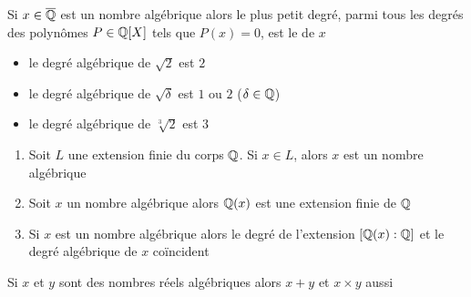 \begin{frame}

Si $x \in \overline{\mathbb{Q}}$ est un nombre algébrique alors le plus petit degré, 
parmi tous les degrés des polynômes $P \in \mathbb{Q}[X]$ tels que $P(x)=0$,
est le  de $x$

\pause

\begin{itemize}
  \item le degré algébrique de $\sqrt 2$ est $2$
  \pause
  \item le degré algébrique de $\sqrt \delta$ est $1$ ou $2$ ($\delta \in \mathbb{Q}$)
  \pause
  \item le degré algébrique de $\sqrt[3]{2}$ est $3$
\end{itemize}
\vspace*{-1ex}
\pause
\begin{proposition}
\begin{enumerate}
  \item Soit $L$ une extension finie du corps $\mathbb{Q}$. Si $x\in L$, alors $x$ est un nombre algébrique
\pause  
  \item Soit $x$ un nombre algébrique alors $\mathbb{Q}(x)$ est une extension finie de $\mathbb{Q}$
\pause  
  \item Si $x$ est un nombre algébrique alors le degré de l'extension $[\mathbb{Q}(x):\mathbb{Q}]$ et le degré algébrique de $x$ coïncident
\end{enumerate}
\end{proposition}

\pause

\begin{corollaire}
Si $x$ et $y$ sont des nombres réels algébriques alors $x+y$ et $x\times y$ aussi
\end{corollaire}
\end{frame}




